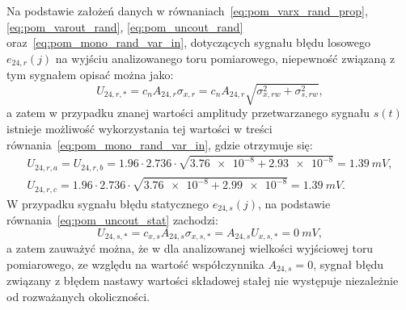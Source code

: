 Na podstawie założeń danych w równaniach~\eqref{eq:pom_varx_rand_prop}, \eqref{eq:pom_varout_rand}, \eqref{eq:pom_uncout_rand} oraz~\eqref{eq:pom_mono_rand_var_in}, dotyczących sygnału błędu losowego $e_{24,r}(j)$ na wyjściu analizowanego toru pomiarowego, niepewność związaną z tym sygnałem opisać można jako:
\begin{equation}
U_{24,r,*} = c_{n} A_{24,r} \sigma_{x,r} = c_{n} A_{24,r} \sqrt{\sigma_{x,rw}^{2} + \sigma_{s,rw}^{2}} \label{eq:pom_mono_unc_rand_all},
\end{equation}
a zatem w przypadku znanej wartości amplitudy przetwarzanego sygnału $s(t)$ istnieje możliwość wykorzystania tej wartości w treści równania~\eqref{eq:pom_mono_rand_var_in}, gdzie otrzymuje się:
\begin{gather}
U_{24,r,a} = U_{24,r,b} = \num{1.96} \cdot \num{2.736} \cdot \sqrt{\num{3.76e-8} + \num{2.93e-8}} = \qty{1.39}{mV} \label{eq:pom_mono_unc_rand_ab}, \\
U_{24,r,c} = \num{1.96} \cdot \num{2.736} \cdot \sqrt{\num{3.76e-8} + \num{2.99e-8}} = \qty{1.39}{mV} \label{eq:pom_mono_unc_rand_c}.
\end{gather}
W przypadku sygnału błędu statycznego $e_{24,s}(j)$, na podstawie równania~\eqref{eq:pom_uncout_stat} zachodzi:
\begin{equation}
U_{24,s,*} = c_{x,s} A_{24,s} \sigma_{x,s,*} = A_{24,s} U_{x,s,*} = \qty{0}{mV} \label{eq:pom_mono_unc_static_all},
\end{equation}
a zatem zauważyć można, że w dla analizowanej wielkości wyjściowej toru pomiarowego, ze względu na wartość współczynnika $A_{24,s} = 0$, sygnał błędu związany z błędem nastawy wartości składowej stałej nie występuje niezależnie od rozważanych okoliczności.

